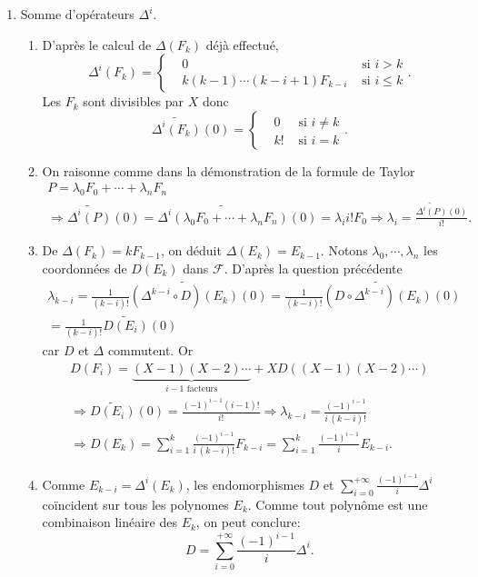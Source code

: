 \begin{enumerate}
 \item Somme d'opérateurs $\Delta^i$.
 \begin{enumerate}
  \item D'après le calcul de $\Delta(F_k)$ déjà effectué,
\[
 \Delta^{i}(F_k) =
 \left\lbrace 
 \begin{aligned}
  &0 &\text{ si } i > k\\
  &k(k-1)\cdots (k-i+1)F_{k-i} &\text{ si } i\leq k
 \end{aligned}
\right. .
\]
Les $F_k$ sont divisibles par $X$ donc 
\[
 \widetilde{\Delta ^i(F_k)}(0) = 
 \left\lbrace 
 \begin{aligned}
  &0  &\text{ si } i \neq k \\
  &k! &\text{ si } i = k
 \end{aligned}
\right. .
\]

  \item On raisonne comme dans la démonstration de la formule de Taylor
\begin{multline*}
 P= \lambda_0 F_0 + \cdots + \lambda_nF_n \\
 \Rightarrow
 \widetilde{\Delta ^i(P)}(0) = \widetilde{\Delta ^i(\lambda_0 F_0 + \cdots + \lambda_nF_n)}(0)
 = \lambda_i i! F_0 
 \Rightarrow \lambda_i = \frac{\widetilde{\Delta ^i(P)}(0)}{i!}.
\end{multline*}

  \item De $\Delta(F_k)= k F_{k-1}$, on déduit $\Delta(E_k) = E_{k-1}$.\newline
  Notons $\lambda_0, \cdots, \lambda_n$ les coordonnées de $D(E_k)$ dans $\mathcal{F}$. D'après la question précédente
\begin{multline*}
 \lambda_{k-i} = \frac{1}{(k-i)!}\widetilde{(\Delta^{k-i} \circ D)(E_k)}(0) = \frac{1}{(k-i)!}\widetilde{(D \circ \Delta^{k-i})(E_k)}(0)\\
 = \frac{1}{(k-i)!}\widetilde{D(E_{i})}(0)
\end{multline*}
car $D$ et $\Delta$ commutent. Or
\begin{multline*}
 D(F_{i}) = \underset{i-1\text{ facteurs}}{\underbrace{(X-1)(X-2)\cdots}} + XD\left( (X-1)(X-2)\cdots\right) \\
 \Rightarrow
 \widetilde{D(E_{i})}(0) = \frac{(-1)^{i-1}(i-1)!}{i!}
 \Rightarrow
 \lambda_{k-i} = \frac{(-1)^{i-1}}{i\, (k-i)!}\\
 \Rightarrow
 D(E_k) = \sum_{i=1}^{k}\frac{(-1)^{i-1}}{i\, (k-i)!} F_{k-i}
 =\sum_{i=1}^{k}\frac{(-1)^{i-1}}{i}E_{k-i}.
\end{multline*}

  \item Comme $E_{k-i} = \Delta^i(E_k)$, les endomorphismes $D$  et $\sum_{i=0}^{+\infty}\frac{(-1)^{i-1}}{i}\Delta^i$ 
coïncident sur tous les polynomes $E_k$. Comme tout polynôme est une combinaison linéaire des $E_k$, on peut conclure:
\[
 D = \sum_{i=0}^{+\infty}\frac{(-1)^{i-1}}{i}\Delta^i.
\]

 \end{enumerate}

\end{enumerate}
